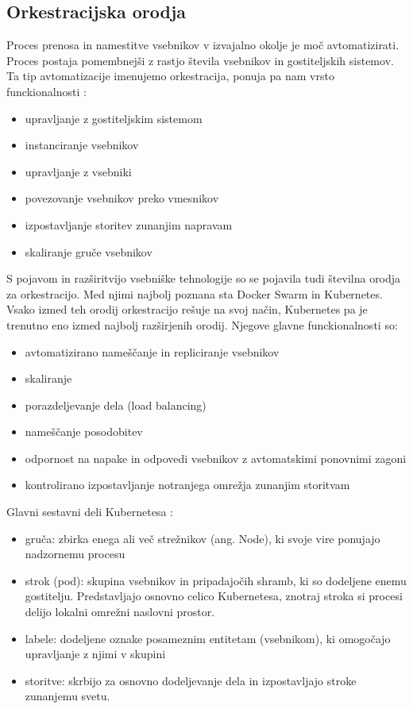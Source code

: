 \documentclass[a4paper, 12pt]{book}
\begin{document}
\subsection{Orkestracijska orodja}

Proces prenosa in namestitve vsebnikov v izvajalno okolje je moč avtomatizirati.
Proces postaja pomembnejši z rastjo števila vsebnikov in gostiteljskih sistemov. 
Ta tip avtomatizacije imenujemo orkestracija, ponuja pa nam vrsto funckionalnosti \cite{mongoKubernetes}:
\begin{itemize}
	\item upravljanje z gostiteljskim sistemom
	\item instanciranje vsebnikov
	\item upravljanje z vsebniki
	\item povezovanje vsebnikov preko vmesnikov
	\item izpostavljanje storitev zunanjim napravam
	\item skaliranje gruče vsebnikov
\end{itemize}

S pojavom in razširitvijo vsebniške tehnologije so se pojavila tudi številna orodja za orkestracijo.
Med njimi najbolj poznana sta Docker Swarm in Kubernetes.
Vsako izmed teh orodij orkestracijo rešuje na svoj način, Kubernetes pa je trenutno eno izmed najbolj razširjenih orodij.
Njegove glavne funckionalnosti so:
\begin{itemize}
	\item avtomatizirano nameščanje in repliciranje vsebnikov
	\item skaliranje
	\item porazdeljevanje dela (load balancing)
	\item nameščanje posodobitev
	\item odpornost na napake in odpovedi vsebnikov z avtomatskimi ponovnimi zagoni
	\item kontrolirano izpostavljanje notranjega omrežja zunanjim storitvam
\end{itemize}

Glavni sestavni deli Kubernetesa \cite{mongoKubernetes}: 
\begin{itemize}
	\item gruča: zbirka enega ali več strežnikov (ang. Node), ki svoje vire ponujajo nadzornemu procesu
	\item strok (pod): skupina vsebnikov in pripadajočih shramb, ki so dodeljene enemu gostitelju. Predstavljajo osnovno celico Kubernetesa, znotraj stroka si procesi delijo lokalni omrežni naslovni prostor.
	\item labele: dodeljene oznake posameznim entitetam (vsebnikom), ki omogočajo upravljanje z njimi v skupini
	\item storitve: skrbijo za osnovno dodeljevanje dela in izpostavljajo stroke zunanjemu svetu.
\end{itemize}
\end{document}
